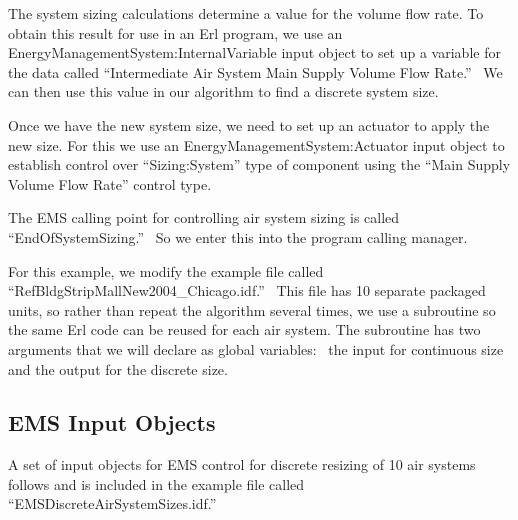 The system sizing calculations determine a value for the volume flow rate. To obtain this result for use in an Erl program, we use an EnergyManagementSystem:InternalVariable input object to set up a variable for the data called ``Intermediate Air System Main Supply Volume Flow Rate.''~ We can then use this value in our algorithm to find a discrete system size.

Once we have the new system size, we need to set up an actuator to apply the new size. For this we use an EnergyManagementSystem:Actuator input object to establish control over ``Sizing:System'' type of component using the ``Main Supply Volume Flow Rate'' control type.

The EMS calling point for controlling air system sizing is called ``EndOfSystemSizing.''~ So we enter this into the program calling manager.

For this example, we modify the example file called ``RefBldgStripMallNew2004\_Chicago.idf.''~ This file has 10 separate packaged units, so rather than repeat the algorithm several times, we use a subroutine so the same Erl code can be reused for each air system. The subroutine has two arguments that we will declare as global variables:~ the input for continuous size and the output for the discrete size.

\subsection{EMS Input Objects}\label{ems-input-objects-010}

A set of input objects for EMS control for discrete resizing of 10 air systems follows and is included in the example file called ``EMSDiscreteAirSystemSizes.idf.''


